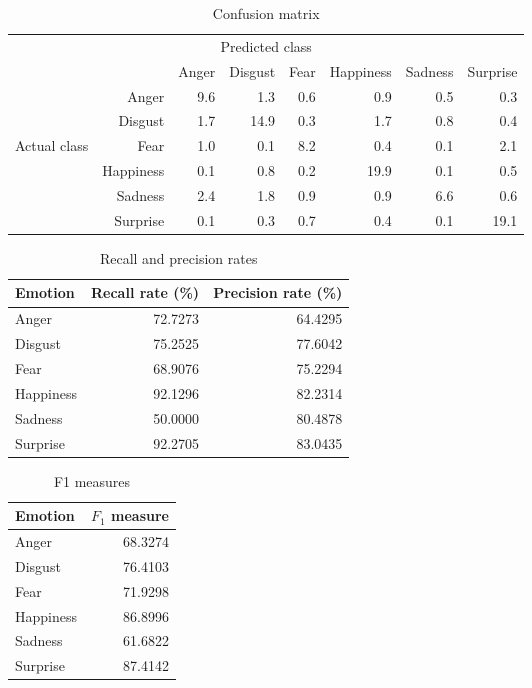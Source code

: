 \documentclass[12pt]{article}
\begin{document}
\begin{table}
\centering
\begin{tabular}{r r | r r r r r r}
\multicolumn{8}{c}{Predicted class} \\
&  & Anger & Disgust & Fear & Happiness & Sadness & Surprise \\
\hline
 & Anger            & 9.6 & 1.3  & 0.6 & 0.9  & 0.5 & 0.3  \\
 & Disgust          & 1.7 & 14.9 & 0.3 & 1.7  & 0.8 & 0.4  \\
Actual class & Fear & 1.0 & 0.1  & 8.2 & 0.4  & 0.1 & 2.1  \\
 & Happiness        & 0.1 & 0.8  & 0.2 & 19.9 & 0.1 & 0.5  \\
 & Sadness          & 2.4 & 1.8  & 0.9 & 0.9  & 6.6 & 0.6  \\
 & Surprise         & 0.1 & 0.3  & 0.7 & 0.4  & 0.1 & 19.1 \\
\end{tabular} 
\caption{Confusion matrix}
\end{table}

\begin{table}
\centering
\begin{tabular}{l | r r}
Emotion & Recall rate (\%) & Precision rate (\%) \\
\hline
Anger     & 72.7273 & 64.4295 \\
Disgust   & 75.2525 & 77.6042 \\
Fear      & 68.9076 & 75.2294 \\
Happiness & 92.1296 & 82.2314 \\
Sadness   & 50.0000 & 80.4878 \\
Surprise  & 92.2705 & 83.0435 \\
\end{tabular}
\caption{Recall and precision rates}
\end{table}

\begin{table}
\centering
\begin{tabular}{l | r}
Emotion & \( F_1 \) measure \\
\hline
Anger     & 68.3274 \\
Disgust   & 76.4103 \\
Fear      & 71.9298 \\
Happiness & 86.8996 \\
Sadness   & 61.6822 \\
Surprise  & 87.4142 \\
\end{tabular}
\caption{F1 measures}
\end{table}
\end{document}
